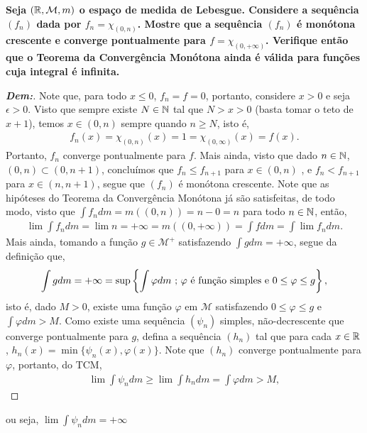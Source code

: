 \biglinend
\newpage
{}
\myexe{\thetres}
\bigline
\textbf{Seja $(\mathbb R, \mathcal M,  m)$ o espaço de medida de Lebesgue. 
Considere a sequência $(f_n)$ dada por $f_n = \chi_{(0, n)}$. Mostre que 
a sequência $(f_n)$ é monótona crescente e converge pontualmente para $f = \chi_{(0, +\infty)}$. 
Verifique então que o Teorema da Convergência Monótona ainda é válida para funções 
cuja integral é infinita.}
\begin{proof}[\textbf{Dem:}] Note que, para todo $x \le 0$, $f_n = f = 0$, portanto, 
  considere $x > 0$ e seja $\epsilon > 0$. Visto que sempre existe $N \in \mathbb N$ tal que 
  $N > x > 0$ (basta tomar o teto de $x+1$), temos $x \in (0, n)$ sempre quando $n \ge N$, 
  isto é, 
  \begin{align*}
    f_n(x) = \chi_{(0, n)}(x) = 1 = \chi_{(0, \infty)}(x) = f(x).
  \end{align*}
  Portanto, $f_n$ converge pontualmente para $f$. Mais ainda, visto que dado $n \in \mathbb N$, 
  $(0, n) \subset (0, n+1)$, concluímos que $f_n \le f_{n+1}$ para $x \in (0, n)$
  , e $f_n < f_{n+1}$ para $x \in (n, n+1)$, segue que $(f_n)$ é 
  monótona crescente. Note que as hipóteses do Teorema da Convergência Monótona 
  já são satisfeitas, de todo modo, visto que $\int f_n dm = m((0, n)) = n - 0 = n$ 
  para todo $n \in \mathbb N$, então, 
  \begin{align*}
    \lim \int f_n dm = \lim n = +\infty = m((0, +\infty)) = \int f dm = \int \lim f_n dm.
  \end{align*}
  Mais ainda, tomando a função $g \in \mathcal M^+$ 
  satisfazendo $\int g dm=+\infty$, segue da definição que, 
  \begin{align*}
    \int g dm = +\infty = \sup \left\{\int \varphi dm \text{ ; } \varphi \text{ é função simples 
    e } 0 \le \varphi \le g\right\},
  \end{align*}
  isto é, dado $M > 0$, existe uma função $\varphi$ em $\mathcal M$
  satisfazendo $0 \le \varphi \le g$ e $\int \varphi dm > M$. Como existe uma 
  sequência $(\psi_n)$ simples, não-decrescente que converge pontualmente para 
  $g$, defina a sequência $(h_n)$ tal que para cada $x \in \mathbb R$, $h_n(x) = 
  \min\{\psi_n (x), \varphi (x)\}$. Note que $(h_n)$ converge pontualmente para 
  $\varphi$, portanto, do TCM,
  \begin{align*}
    \lim \int \psi_n dm \ge \lim \int h_n dm = \int \varphi dm > M,
  \end{align*}
\end{proof}
ou seja, $\lim \int \psi_n dm = +\infty$

